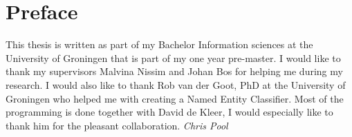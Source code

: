 \documentclass[
10pt, %
a4paper, %
oneside, %
headinclude,footinclude, %
BCOR5mm, %
]{scrartcl}
\begin{document}
\newpage
\section*{Preface} %
This thesis is written as part of my Bachelor Information sciences at the University of Groningen that is part of my one year pre-master.  
\vl
I would like to thank my supervisors Malvina Nissim and Johan Bos for helping me during my research. I would also like to thank Rob van der Goot, PhD at the University of Groningen who helped me with creating a Named Entity Classifier.
\vl
Most of the programming is done together with David de Kleer, I would especially like to thank him for the pleasant collaboration.
\vl
\textit{Chris Pool}

\newpage
\setcounter{tocdepth}{3} %
\tableofcontents %

\listoffigures %

\listoftables %

\lstlistoflistings
\newpage
\end{document}

